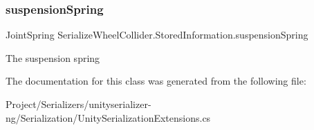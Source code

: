 \subsubsection{\texorpdfstring{suspension\+Spring}{suspensionSpring}}
{\footnotesize\ttfamily Joint\+Spring Serialize\+Wheel\+Collider.\+Stored\+Information.\+suspension\+Spring}



The suspension spring 



The documentation for this class was generated from the following file\+:\begin{DoxyCompactItemize}
\item 
Project/\+Serializers/unityserializer-\/ng/\+Serialization/Unity\+Serialization\+Extensions.\+cs\end{DoxyCompactItemize}
